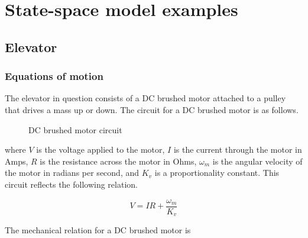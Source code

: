 \section{State-space model examples}

\subsection{Elevator}

\subsubsection{Equations of motion}

The elevator in question consists of a DC brushed motor attached to a pulley
that drives a mass up or down. The circuit for a DC brushed motor is as follows.

\begin{figure}[H]
  \centering


  \caption{DC brushed motor circuit}
  \label{fig:dc_motor_circuit}
\end{figure}

where $V$ is the voltage applied to the motor, $I$ is the current through the
motor in Amps, $R$ is the resistance across the motor in Ohms, $\omega_m$ is the
angular velocity of the motor in radians per second, and $K_v$ is a
proportionality constant. This circuit reflects the following relation.

\begin{equation}
  V = IR + \frac{\omega_m}{K_v} \label{eq:elevator_V}
\end{equation}

The mechanical relation for a DC brushed motor is

